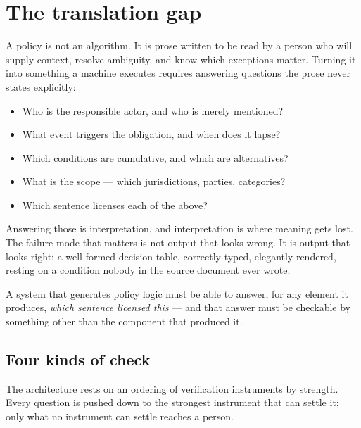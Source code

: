 \documentclass[11pt]{article}
\begin{document}
\vspace{1.2em}
\noindent{\color{hairline}\rule{\linewidth}{0.6pt}}

\clearpage
\tableofcontents
\clearpage

\section{The translation gap}

A policy is not an algorithm. It is prose written to be read by a person
who will supply context, resolve ambiguity, and know which exceptions
matter. Turning it into something a machine executes requires answering
questions the prose never states explicitly:

\begin{itemize}
  \item Who is the responsible actor, and who is merely mentioned?
  \item What event triggers the obligation, and when does it lapse?
  \item Which conditions are cumulative, and which are alternatives?
  \item What is the scope --- which jurisdictions, parties, categories?
  \item Which sentence licenses each of the above?
\end{itemize}

Answering those is interpretation, and interpretation is where meaning
gets lost. The failure mode that matters is not output that looks wrong.
It is output that looks right: a well-formed decision table, correctly
typed, elegantly rendered, resting on a condition nobody in the source
document ever wrote.

\begin{keypoint}[title={The design constraint}]
A system that generates policy logic must be able to answer, for any
element it produces, \emph{which sentence licensed this} --- and that
answer must be checkable by something other than the component that
produced it.
\end{keypoint}

\subsection{Four kinds of check}

The architecture rests on an ordering of verification instruments by
strength. Every question is pushed down to the strongest instrument that
can settle it; only what no instrument can settle reaches a person.
\end{document}
